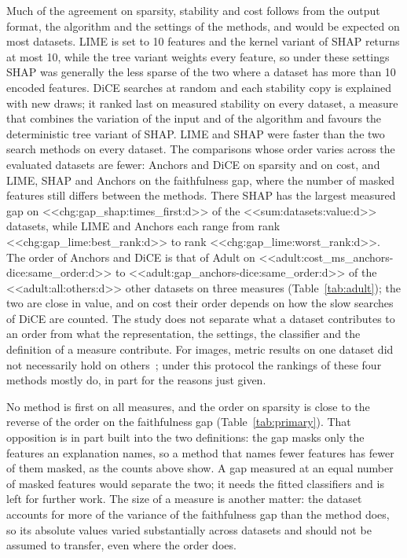 \documentclass[10pt,a4paper,twocolumn]{article}
\begin{document}
Much of the agreement on sparsity, stability and cost follows from the output format, the
algorithm and the settings of the methods, and would be expected on most datasets. LIME is set
to 10 features and the kernel variant of SHAP returns at most 10, while the tree variant
weights every feature, so under these settings SHAP was generally the less sparse of the
two where a dataset has more than 10 encoded features. DiCE searches at random and each
stability copy is explained with new draws; it ranked last on measured stability on
every dataset, a measure that combines the variation of the input and of the algorithm
and favours the deterministic tree variant of SHAP. LIME and SHAP were faster than the
two search methods on every dataset. The comparisons whose order varies across the
evaluated datasets are fewer: Anchors and DiCE on sparsity and on cost, and LIME, SHAP
and Anchors on the faithfulness gap, where the number of masked features still differs
between the methods. There SHAP has the largest measured gap on
<<chg:gap_shap:times_first:d>> of the <<sum:datasets:value:d>> datasets, while LIME and
Anchors each range from rank <<chg:gap_lime:best_rank:d>> to rank
<<chg:gap_lime:worst_rank:d>>. The order of Anchors and DiCE is that of Adult on
<<adult:cost_ms_anchors-dice:same_order:d>> to <<adult:gap_anchors-dice:same_order:d>> of
the <<adult:all:others:d>> other datasets on three measures (Table~\ref{tab:adult}); the
two are close in value, and on cost their order depends on how the slow searches of DiCE
are counted. The study does not separate what a dataset contributes to an order from
what the representation, the settings, the classifier and the definition of a measure
contribute. For images, metric results on one dataset did not necessarily hold on
others~\cite{gevaert2024evaluating}; under this protocol the rankings of these four
methods mostly do, in part for the reasons just given.

No method is first on all measures, and the order on sparsity is close to the reverse of
the order on the faithfulness gap (Table~\ref{tab:primary}). That opposition is in part
built into the two definitions: the gap masks only the features an explanation names, so
a method that names fewer features has fewer of them masked, as the counts above show. A
gap measured at an equal number of masked features would separate the two; it needs the
fitted classifiers and is left for further work. The size of a measure
is another matter: the dataset accounts for more of the variance of the faithfulness gap
than the method does, so its absolute values varied substantially across datasets and
should not be assumed to transfer, even where the order does.
\end{document}
